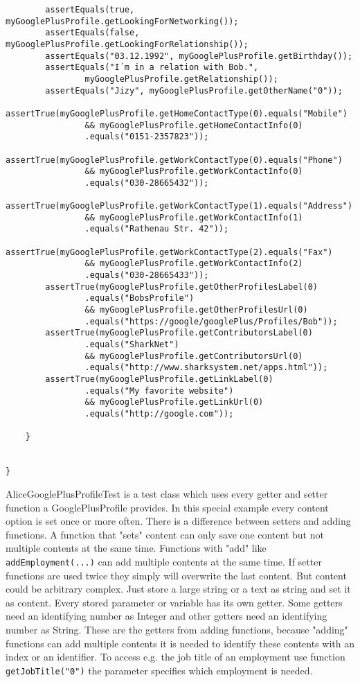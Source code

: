 \documentclass[12pt]{article}
\begin{document}
\begin{verbatim}
        assertEquals(true, myGooglePlusProfile.getLookingForNetworking());
        assertEquals(false, myGooglePlusProfile.getLookingForRelationship());
        assertEquals("03.12.1992", myGooglePlusProfile.getBirthday());
        assertEquals("I´m in a relation with Bob.",
                myGooglePlusProfile.getRelationship());
        assertEquals("Jizy", myGooglePlusProfile.getOtherName("0"));
        assertTrue(myGooglePlusProfile.getHomeContactType(0).equals("Mobile")
                && myGooglePlusProfile.getHomeContactInfo(0)
                .equals("0151-2357823"));
        assertTrue(myGooglePlusProfile.getWorkContactType(0).equals("Phone") 
                && myGooglePlusProfile.getWorkContactInfo(0)
                .equals("030-28665432"));
        assertTrue(myGooglePlusProfile.getWorkContactType(1).equals("Address")
                && myGooglePlusProfile.getWorkContactInfo(1)
                .equals("Rathenau Str. 42"));
        assertTrue(myGooglePlusProfile.getWorkContactType(2).equals("Fax")
                && myGooglePlusProfile.getWorkContactInfo(2)
                .equals("030-28665433"));
        assertTrue(myGooglePlusProfile.getOtherProfilesLabel(0)
                .equals("BobsProfile")
                && myGooglePlusProfile.getOtherProfilesUrl(0)
                .equals("https://google/googlePlus/Profiles/Bob"));
        assertTrue(myGooglePlusProfile.getContributorsLabel(0)
                .equals("SharkNet") 
                && myGooglePlusProfile.getContributorsUrl(0)
                .equals("http://www.sharksystem.net/apps.html"));
        assertTrue(myGooglePlusProfile.getLinkLabel(0)
                .equals("My favorite website") 
                && myGooglePlusProfile.getLinkUrl(0)        
                .equals("http://google.com"));

    }

    
} 
\end{verbatim}

AliceGooglePlusProfileTest is a test class which uses every getter and setter function a GooglePlusProfile provides. In this special example every content option is set once or more often. There is a difference between setters and adding functions. A function that "sets" content can only save one content but not multiple contents at the same time. Functions with "add" like {\tt addEmployment(...)} can add multiple contents at the same time. If setter functions are used twice they simply will overwrite the last content. But content could be arbitrary complex. Just store a large string or a text as string and set it as content. Every stored parameter or variable has its own getter. Some getters need an identifying number as Integer and other getters need an identifying number as String. These are the getters from adding functions, because "adding" functions can add multiple contents it is needed to identify these contents with an index or an identifier. To access e.g. the job title of an employment use function {\tt getJobTitle("0")} the parameter specifies which employment is needed. 
\end{document}
